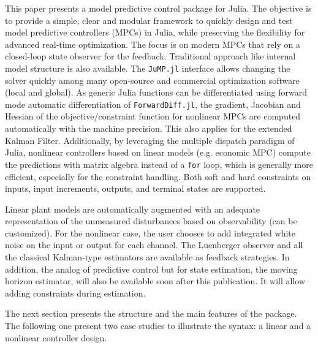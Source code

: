 This paper presents a model predictive control package for Julia. The objective is to provide a simple, clear and modular framework to quickly design and test model predictive controllers (MPCs) in Julia, while preserving the flexibility for advanced real-time optimization. The focus is on modern MPCs that rely on a closed-loop state observer for the feedback. Traditional approach like internal model structure is also available. The \texttt{JuMP.jl} interface allows changing the solver quickly among  many open-source and commercial optimization software (local and global). As generic Julia functions can be differentiated using forward mode automatic differentiation of \texttt{ForwardDiff.jl}, the gradient, Jacobian and Hessian of the objective/constraint function for nonlinear MPCs are computed automatically with the machine precision. This also applies for the extended Kalman Filter. Additionally, by leveraging the multiple dispatch paradigm of Julia, nonlinear
controllers based on linear models (e.g. economic MPC) compute the predictions with matrix algebra instead of a \texttt{for} loop, which is generally more efficient, especially for the constraint handling. Both soft and hard constraints on inputs, input increments, outputs, and terminal states are supported. 

Linear plant models are automatically augmented with an adequate representation of the unmeasured disturbances based on observability (can be customized). For the nonlinear case, the user chooses to add integrated white noise on the input or output for each channel. The Luenberger observer and all the classical Kalman-type estimators are available as feedback strategies. In addition, the analog of predictive control but for state estimation, the moving horizon estimator, will also be available soon after this publication. It will allow adding constraints during estimation.

The next section presents the structure and the main features of the package. The following one present two case studies to illustrate the syntax: a linear and a nonlinear controller design.